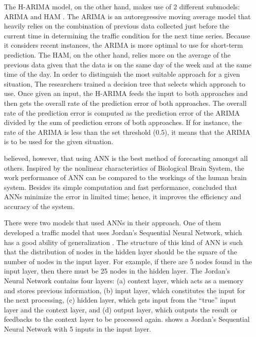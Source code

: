 The H-ARIMA model, on the other hand, makes use of 2 different submodels: ARIMA and HAM . The ARIMA is an autoregressive moving average model that heavily relies on the combination of previous data collected just before the current time in determining the traffic condition for the next time series. Because it considers recent instances, the ARIMA is more optimal to use for short-term prediction. The HAM, on the other hand, relies more on the average of the previous data given that the data is on the same day of the week and at the same time of the day. In order to distinguish the most suitable approach for a given situation, The researchers trained a decision tree that selects which approach to use. Once given an input, the H-ARIMA feeds the input to both approaches and then gets the overall rate of the prediction error of both approaches. The overall rate of the prediction error is computed as the prediction error of the ARIMA divided by the sum of prediction errors of both approaches. If for instance, the rate of the ARIMA is less than the set threshold (0.5), it means that the ARIMA is to be used for the given situation.

 believed, however, that using ANN is the best method of forecasting amongst all others. Inspired by the nonlinear characteristics of Biological Brain System, the work performance of ANN can be compared to the workings of the human brain system. Besides its simple computation and fast performance,  concluded that ANNs minimize the error in limited time; hence, it improves the efficiency and accuracy of the system. 

There were two models that used ANNs in their approach. One of them developed a traffic model that uses Jordan’s Sequential Neural Network, which has a good ability of generalization . The structure of this kind of ANN is such that the distribution of nodes in the hidden layer should be the square of the number of nodes in the input layer. For example, if there are 5 nodes found in the input layer, then there must be 25 nodes in the hidden layer. The Jordan’s Neural Network contains four layers: (a) context layer, which acts as a memory and stores previous information, (b) input layer, which constitutes the input for the next processing, (c) hidden layer, which gets input from the “true” input layer and the context layer, and (d) output layer, which outputs the result or feedbacks to the context layer to be processed again.  shows a Jordan’s Sequential Neural Network with 5 inputs in the input layer.

